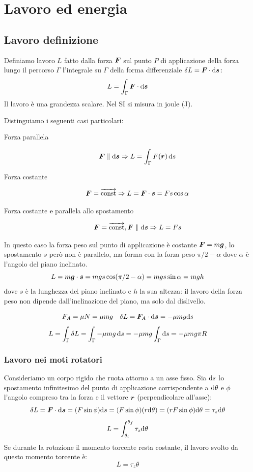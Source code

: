 \chapter{Lavoro ed energia}
\minitoc
\section{Lavoro definizione}
\begin{Def}[lavoro]
  Definiamo lavoro $L$ fatto dalla forza $\boldsymbol{F}$ sul punto $P$ di applicazione della forza lungo il percorso $\Gamma$ l'integrale su $\Gamma$ della forma differenziale $\delta L = \boldsymbol{F}\cdot\mathrm{d}\boldsymbol{s}$:
  \begin{equation}
    L=\int_\Gamma\boldsymbol{F}\cdot\mathrm{d} \boldsymbol{s}
  \end{equation}
  Il lavoro è una grandezza scalare. Nel SI si misura in joule (\si{\joule}).
\end{Def}
Distinguiamo i seguenti casi particolari:
\begin{description}
  \item[Forza parallela]
    \[\boldsymbol{F} \parallel \mathrm{d}\boldsymbol{s}\Rightarrow L=\int_\Gamma F(\boldsymbol{r})\,\mathrm{d} s\]
  \item[Forza costante]
    \[\boldsymbol{F} = \overrightarrow{\text{const}}\Rightarrow L=\boldsymbol{F} \cdot \boldsymbol{s} = Fs\cos\alpha\]
  \item[Forza costante e parallela allo spostamento]
    \[\boldsymbol{F} = \overrightarrow{\text{const}}, \boldsymbol{F} \parallel \mathrm{d}\boldsymbol{s}\Rightarrow L=Fs\]
\end{description}
\begin{Es}
  In questo caso la forza peso sul punto di applicazione è costante $\boldsymbol{F}=m\boldsymbol{g}$, lo spostamento $s$ però non è parallelo, ma forma con la forza peso $\pi/2 -\alpha$ dove $\alpha$ è l'angolo del piano inclinato.
  \[
    L = m\boldsymbol{g} \cdot \boldsymbol{s} = mgs\cos(\pi/2 - \alpha) = mgs\sin\alpha = mgh
  \]
  dove $s$ è la lunghezza del piano inclinato e $h$ la sua altezza: il lavoro della forza peso non dipende dall'inclinazione del piano, ma solo dal dislivello.
\end{Es}

\begin{Es}
  \[F_A=\mu N=\mu mg\quad \delta L=\boldsymbol{F}_A\cdot\mathrm{d} \boldsymbol{s}=-\mu mg\mathrm{d} s\]
  \[L=\int_\Gamma \delta L=\int_\Gamma -\mu mg\,\mathrm{d} s=-\mu mg\int_\Gamma\mathrm{d}
    s=-\mu mg\pi R\]
\end{Es}
\subsection{Lavoro nei moti rotatori}
Consideriamo un corpo rigido che ruota attorno a un asse fisso. Sia $\mathrm{d} s$ lo spostamento
infinitesimo del punto di applicazione corrispondente a $\mathrm{d} \theta$ e $\phi$ l'angolo
compreso tra la forza e il vettore $\boldsymbol{r}$ (perpendicolare all'asse):
\[
  \delta L=\boldsymbol{F}\cdot\mathrm{d}\boldsymbol{s}=(F\sin \phi)\mathrm{d} s=(F \sin \phi)(r
  \mathrm{d}\theta)=(rF\sin\phi)\mathrm{d} \theta=\tau_z\mathrm{d}\theta
\]
\[L=\int_{\theta_i}^{\theta_f}\tau_z\mathrm{d}\theta\]
Se durante la rotazione il momento torcente resta costante, il
lavoro svolto da questo momento torcente è:
\[L=\tau_z\theta\]
